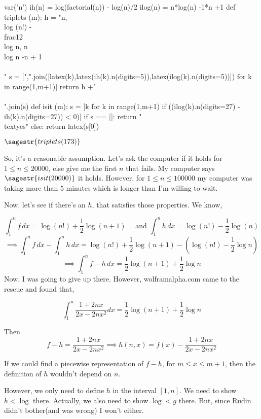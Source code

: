 \documentclass{article}
\begin{document}
\begin{sagesilent}
  var('n')
  ih(n) = log(factorial(n)) - log(n)/2
  ilog(n) = n*log(n) -1*n +1
  def triplets (m):
      h = "n,\\log (n!) -\\frac{1}{2}\\log n, n\\log n -n + 1\\\\"
      s = [",".join([latex(k),latex(ih(k).n(digits=5)),latex(ilog(k).n(digits=5))])  for k in range(1,m+1)]
      return  h +"\\\\".join(s)
  def isit (m):
      s = [k  for k in range(1,m+1) if ((ilog(k).n(digits=27) -ih(k).n(digits=27)) < 0)]
      if s == []:
          return "\\text{yes}"
      else:
          return latex(s[0])
\end{sagesilent}
$\sagestr{triplets(173)}$

So, it's a reasonable assumption. Let's ask the computer if it holds
for $1\leq n \leq 20000$, else give me the first $n$ that fails. My
computer says $\sagestr{isit(20000)}$ it holds. However, for $1\leq
n\leq 100000$ my
computer was taking more than $5$ minutes which is longer than I'm willing
to wait.

Now, let's see if there's an $h$, that satisfies those properties. We
know,

\[\int_1^n f\, dx = \log(n!) +\frac{1}{2}\log(n+1)\quad \text{ and }
  \int_1^n h\, dx = \log(n!) -\frac{1}{2}\log(n)\]
\[\implies \int_1^n f\, dx -\int_1^n h\, dx = \log(n!)
  +\frac{1}{2}\log(n+1)  -\left(  \log(n!)
    -\frac{1}{2}\log n\right)\]
\[\implies \int_1^n f- h\, dx =
  \frac{1}{2}\log(n+1)  + \frac{1}{2}\log n\]
Now, I was going to give up there. However, wolframalpha.com came to
the rescue and found that,

\[\int_1^n \frac{1+2nx}{2x-2nx^2} dx = \frac{1}{2}\log(n+1)  + \frac{1}{2}\log n\]

Then \[f-h = \frac{1+2nx}{2x-2nx^2} \implies h(n,x) = f(x) -
  \frac{1+2nx}{2x-2nx^2}\]

If we could find a piecewise representation of $f-h$, for $m\leq x\leq
m+1$, then the definition of $h$ wouldn't depend on $n$.

However, we only need to define $h$ in the interval $[1,n]$. We need
to show $h < \log$ there. Actually, we also need to show $\log < g$
there. But, since Rudin didn't bother(and was wrong) I won't
either.
\end{document}
